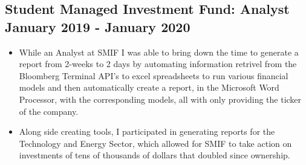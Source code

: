 \documentclass{article}
\begin{document}
\subsection{\large Student Managed Investment Fund: Analyst \hfill \small January 2019 - January 2020}
\begin{itemize}
\setlength\itemsep{.1em}
	\item While an Analyst at SMIF I was able to bring down the time to generate a report from 2-weeks to 2 days by automating information retrivel from the Bloomberg Terminal API's to excel spreadsheets to run various financial models and then automatically create a report, in the Microsoft Word Processor, with the corresponding models, all with only providing the ticker of the company. 
	\item Along side creating tools, I participated in generating reports for the Technology and Energy Sector, which allowed for SMIF to take action on investments of tens of thousands of dollars that doubled since ownership.
\end{itemize}
\end{document}
